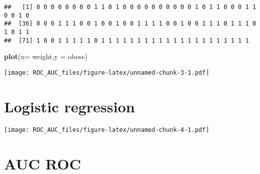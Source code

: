\documentclass[]{article}
\newenvironment{Shaded}{\begin{snugshade}}{\end{snugshade}}
\newcommand{\KeywordTok}[1]{\textcolor[rgb]{0.13,0.29,0.53}{\textbf{#1}}}
\newcommand{\DataTypeTok}[1]{\textcolor[rgb]{0.13,0.29,0.53}{#1}}
\newcommand{\DecValTok}[1]{\textcolor[rgb]{0.00,0.00,0.81}{#1}}
\newcommand{\StringTok}[1]{\textcolor[rgb]{0.31,0.60,0.02}{#1}}
\newcommand{\OtherTok}[1]{\textcolor[rgb]{0.56,0.35,0.01}{#1}}
\newcommand{\OperatorTok}[1]{\textcolor[rgb]{0.81,0.36,0.00}{\textbf{#1}}}
\newcommand{\NormalTok}[1]{#1}
\begin{document}
\begin{verbatim}
##   [1] 0 0 0 0 0 0 0 0 1 1 0 1 0 0 0 0 0 0 0 0 0 0 1 0 1 1 0 0 0 1 1 0 0 1 0
##  [36] 0 0 0 1 1 1 0 0 1 0 0 1 0 0 1 1 1 1 0 0 1 0 0 1 1 1 0 1 1 1 0 1 0 1 1
##  [71] 1 0 0 1 1 1 1 1 0 1 1 1 1 1 1 1 1 1 1 1 1 1 1 1 1 1 1 1 1 1
\end{verbatim}

\begin{Shaded}
\begin{Highlighting}[]
\KeywordTok{plot}\NormalTok{(}\DataTypeTok{x=}\NormalTok{ weight,}\DataTypeTok{y =}\NormalTok{ obese)}
\end{Highlighting}
\end{Shaded}

\texttt{[image: ROC\_AUC\_files/figure-latex/unnamed-chunk-3-1.pdf]}

\section{Logistic regression}\label{logistic-regression}

\begin{Shaded}
\end{Shaded}

\texttt{[image: ROC\_AUC\_files/figure-latex/unnamed-chunk-4-1.pdf]}

\section{AUC ROC}\label{auc-roc}

\begin{Shaded}
\end{Shaded}
\end{document}
